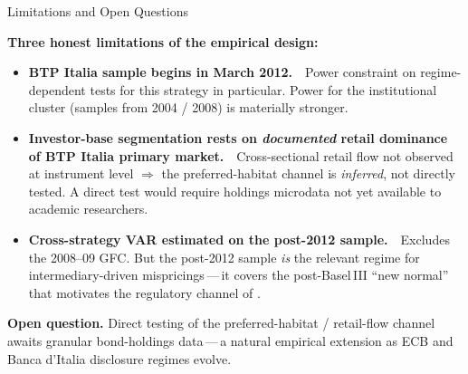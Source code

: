 \documentclass[aspectratio=169,11pt]{beamer}
\newcommand{\hlt}[1]{\textcolor{edhecred}{\textbf{#1}}}     %
\newcommand{\hltb}[1]{\textcolor{accentblue}{\textbf{#1}}}  %
\begin{document}
\begin{frame}[t]{Limitations and Open Questions}
\small
\vspace{0.10cm}

\textbf{Three honest limitations of the empirical design:}

\vspace{0.30cm}

\begin{itemize}\itemsep=0.25cm

  \item \hlt{BTP Italia sample begins in March 2012.}\ \  Power constraint on
        regime-dependent tests for this strategy in particular.
        Power for the institutional cluster (samples from 2004 / 2008) is materially stronger.

  \item \hlt{Investor-base segmentation rests on \emph{documented} retail
        dominance of BTP Italia primary market.}\ \  Cross-sectional retail flow not
        observed at instrument level $\Rightarrow$ the preferred-habitat channel is
        \emph{inferred}, not directly tested. A direct test would require holdings
        microdata not yet available to academic researchers.

  \item \hlt{Cross-strategy VAR estimated on the post-2012 sample.}\ \
        Excludes the 2008--09 GFC. But the post-2012 sample \emph{is} the relevant
        regime for intermediary-driven mispricings\,---\,it covers the post-Basel\,III
        ``new normal'' that motivates the regulatory channel of \citet{boyarchenko2016trends}.

\end{itemize}

\vspace{0.30cm}

\hltb{Open question.} Direct testing of the preferred-habitat / retail-flow
channel awaits granular bond-holdings data\,---\,a natural empirical extension as
ECB and Banca d'Italia disclosure regimes evolve.

\end{frame}

\end{document}
